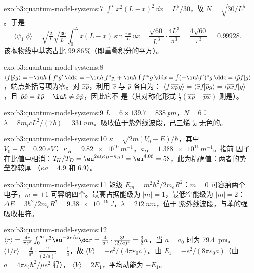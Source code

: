 \begin{solution}{exo:b3:quantum-model-systems:7}
$\int_0^Lx^2(L - x)^2\,\dd x = L^5/30$，故 $N = \sqrt{30/L^5}$。于是
\[
\langle\psi_1|\phi\rangle = \sqrt{\tfrac2L}\sqrt{\tfrac{30}{L^5}}\int_0^Lx(L -
x)\sin\tfrac{\pi x}{L}\,\dd x = \frac{\sqrt{60}}{L^3}\cdot\frac{4L^3}{\pi^3} =
\frac{4\sqrt{60}}{\pi^3} = 0.99928 .
\]
该抛物线中基态占比 99.86\,\%（即重叠积分的平方）。
\end{solution}

\begin{solution}{exo:b3:quantum-model-systems:8}
$\langle f|\hat pg\rangle = -\iu\hbar\int f^*g'\,\dd x = -\iu\hbar[f^*g] +
\iu\hbar\int f^{*\prime}g\,\dd x = \int(-\iu\hbar f')^*g\,\dd x = \langle\hat
pf|g\rangle$，端点处括号项为零。对 $\hat x\hat p$，利用 $\hat x$ 与 $\hat p$ 各自为：
$\langle f|\hat x\hat pg\rangle = \langle\hat xf|\hat pg\rangle = \langle\hat p\hat
xf|g\rangle$，且 $\hat p\hat x = \hat x\hat p - \iu\hbar \ne \hat x\hat p$，因此它不
是（其对称化形式 $\frac12(\hat x\hat p + \hat p\hat x)$ 则是）。
\end{solution}

\begin{solution}{exo:b3:quantum-model-systems:9}
$L = 6 \times 139.7 = \qty{838}{pm}$，$N = 6$：$\lambda = 8m_ecL^2/(7h) =
\qty{331}{nm}$。吸收位于紫外线波段，己三烯
是无色的。
\end{solution}

\begin{solution}{exo:b3:quantum-model-systems:10}
$\kappa = \sqrt{2m(V_0 - E)}/\hbar$，其中 $V_0 - E = \qty{0.20}{eV}$：
$\kappa_H = \qty{9.82e10}{m^{-1}}$，$\kappa_D = \qty{1.388e11}{m^{-1}}$。指前
因子在比值中相消：$T_H/T_D = \eu^{2a(\kappa_D - \kappa_H)} =
\eu^{4.06} = 58$，此为精确值：两者的势垒都较厚
（$\kappa a = 4.9$ 和 6.9）。
\end{solution}

\begin{solution}{exo:b3:quantum-model-systems:11}
能级 $E_m = m^2\hbar^2/2m_eR^2$：$m = 0$ 可容纳两个电子，$m = \pm1$
可容纳四个。最高占据能级为 $|m| = 1$，最低空能级为 $|m| = 2$：$\Delta E =
3\hbar^2/2m_eR^2 = \qty{9.38e-19}{J}$，$\lambda = \qty{212}{nm}$，位于
紫外线波段，与苯的强吸收相符。
\end{solution}

\begin{solution}{exo:b3:quantum-model-systems:12}
$\langle r\rangle = \frac{4\pi}{\pi a^3}\int_0^\infty r^3\eu^{-2r/a}\dd r =
\frac{4}{a^3}\cdot\frac{3!}{(2/a)^4} = \frac32a$，当 $a = a_0$ 时为 \qty{79.4}{pm}。
$\langle 1/r\rangle = \frac{4}{a^3}\cdot\frac{1!}{(2/a)^2} = \frac1a$，故
$\langle V\rangle = -e^2/(4\pi\varepsilon_0a)$。由 $E_1 =
-e^2/(8\pi\varepsilon_0a)$（由 $a = 4\pi\varepsilon_0\hbar^2/\mu e^2$ 得），
$\langle V\rangle = 2E_1$，平均动能为 $-E_1$。
\end{solution}

